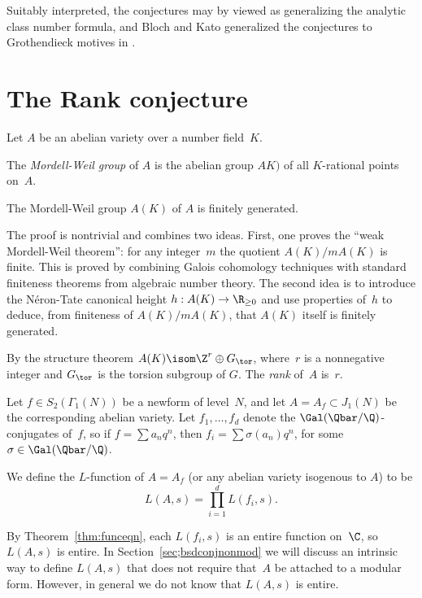 \documentclass{report}
\begin{document}
Suitably interpreted, the conjectures may by viewed as generalizing
the analytic class number formula, and Bloch and Kato generalized the
conjectures to Grothendieck motives in \cite{bloch-kato}.

\section{The Rank conjecture}
Let $A$ be an abelian variety over a number field~$K$.

\begin{definition}
The {\em Mordell-Weil group} of $A$ is the abelian group $AK)$ of all $K$-rational
points on~$A$.
\end{definition}

\begin{theorem}
The Mordell-Weil group $A(K)$ of $A$ is finitely generated.
\end{theorem}
The proof is nontrivial and combines two ideas.  First, one proves the
``weak Mordell-Weil theorem'': for any integer~$m$ the quotient $A(K)/mA(K)$ is
finite.  This is proved by combining Galois cohomology techniques with
standard finiteness theorems from algebraic number theory.  The second
idea is to introduce the N\'eron-Tate canonical height
$h:A(K)\to\R_{\geq 0}$ and use properties of~$h$ to deduce, from
finiteness of $A(K)/ m A(K)$, that $A(K)$ itself is finitely generated.

\begin{definition}[Rank]
  By the structure
  theorem $A(K)\isom \Z^r \oplus G_{\tor}$, where~$r$ is a nonnegative
  integer and $G_{\tor}$ is the torsion subgroup of $G$.  The {\em
    rank} of~$A$ is~$r$.
\end{definition}

Let $f \in S_2(\Gamma_1(N))$ be a newform of level~$N$, and let
$A=A_f\subset J_1(N)$ be the corresponding abelian variety.  Let
$f_1,\ldots, f_d$ denote the $\Gal(\Qbar/\Q)$-conjugates of~$f$, so if
$f=\sum a_n q^n$, then $f_i = \sum \sigma(a_n)q^n$, for some
$\sigma\in\Gal(\Qbar/\Q)$.

\begin{definition}[$L$-function of $A$]
We define the $L$-function of $A=A_f$ (or any abelian variety isogenous
to $A$) to be
$$
L(A,s) = \prod_{i=1}^d L(f_i,s).
$$
\end{definition}
By Theorem~\ref{thm:funceqn}, each $L(f_i,s)$ is an entire function
on~$\C$, so $L(A,s)$ is entire.  In Section~\ref{sec;bsdconjnonmod} we
will discuss an intrinsic way to define $L(A,s)$ that does not
require that~$A$ be attached to a modular form.   However, in
general we do not know that $L(A,s)$ is entire.
\end{document}
